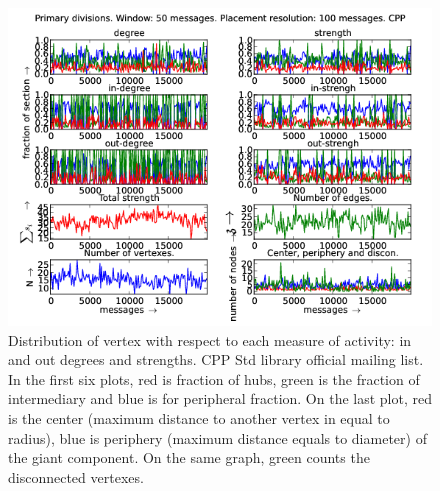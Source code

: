 \documentclass[%
 aip,
 jmp,%
 amsmath,amssymb,
 reprint,%
]{revtex4-1}
\begin{document}
\begin{figure}[hbtp] 
   \centering
        \includegraphics[width=\textwidth]{figs/CPP/50}
    \caption{Distribution of vertex with respect to each measure of activity: in and out degrees and strengths. CPP Std library official mailing list. In the first six plots, red is fraction of hubs, green is the fraction of intermediary and blue is for peripheral fraction. On the last plot, red is the center (maximum distance to another vertex in equal to radius), blue is periphery (maximum distance equals to diameter) of the giant component. On the same graph, green counts the disconnected vertexes.}
    \label{fig:cpp50}
\end{figure}
\end{document}

